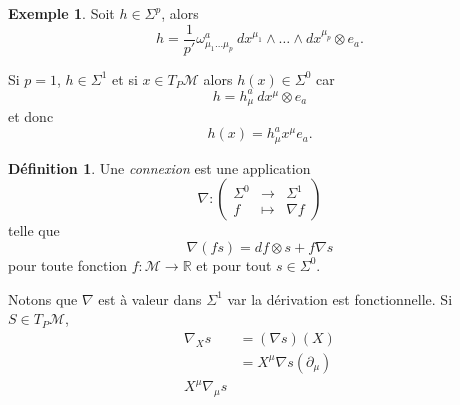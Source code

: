 \documentclass[a4paper,11pt]{report}
\theoremstyle{definition}
\theoremstyle{plain}
\theoremstyle{definition}
\newtheorem{defn}{Définition}[chapter]
\newtheorem{exmp}{Exemple}[chapter]
\theoremstyle{remark}
\newcommand{\M}{\mathscr{M}}
\newcommand{\p}{\partial}
\begin{document}
                \begin{exmp}
                    Soit $h\in \Sigma^p$, alors
                    \begin{equation}
                        h = \frac{1}{p'}\omega^a_{\mu_1\dots\mu_p}~dx^{\mu_1}\wedge\dots\wedge dx^{\mu_p}\otimes e_a.
                    \end{equation}
                    
                    Si $p=1$, $h\in\Sigma^1$ et si $x\in T_P\M$ alors $h(x)\in\Sigma^0$ car 
                    \begin{equation}
                        h = h^a_\mu~dx^\mu\otimes e_a
                    \end{equation}
                    et donc
                    \begin{equation}
                        h(x) = h^a_\mu x^\mu e_a.
                    \end{equation}
                \end{exmp}
                
                \begin{defn}
                    Une \textit{connexion} est une application
                    \begin{equation}
                    \nabla:\left(
                    \begin{array}{ccc}
                        \Sigma^0 & \longrightarrow & \Sigma^1 \\
                        f & \longmapsto & \nabla f
                    \end{array}
                    \right)
                    \end{equation}
                    telle que 
                    \begin{equation}
                        \nabla(fs) = df\otimes s+f\nabla s
                    \end{equation}
                    pour toute fonction $f:\M\to\mathbb{R}$ et pour tout $s\in\Sigma^0$.
                \end{defn}
                
                Notons que $\nabla$ est à valeur dans $\Sigma^1$ var la dérivation est fonctionnelle. Si $S\in T_P\M$,
                \begin{align}
                    \nabla_X s &= (\nabla s)(X)\\
                    &= X^\mu\nabla s(\p_\mu)\\
                    X^\mu\nabla_\mu s
                \end{align}
             
\end{document}
